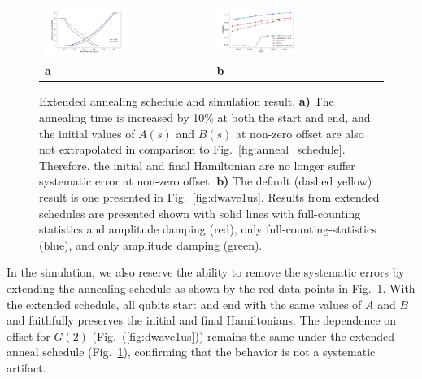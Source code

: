 \documentclass[prd,twocolumn,tightenlines,preprintnumbers,showpacs,superscriptaddress,notitlepage,nofootinbib,eqsecnum,floatfix,longbibliography,aps,10pt]{revtex4-2}
\begin{document}
\begin{figure}
    \centering
	\begin{tabular}{p{}p{}}
	\includegraphics[width=0.5\textwidth]{./new_figures/anneal_schedule_extended.pdf}
    &
	\includegraphics[width=0.5\textwidth]{./new_figures/NN2_offset_scaling_extended.pdf}\\
	\centering \textbf{a} & \centering \textbf{b}
	\end{tabular}
	\centering
	\caption{Extended annealing schedule and simulation result. \textbf{a)} The annealing time is increased by 10\% at both the start and end, and the initial values of $A(s)$ and $B(s)$ at non-zero offset are also not extrapolated in comparison to Fig.~\ref{fig:anneal_schedule}. Therefore, the initial and final Hamiltonian are no longer suffer systematic error at non-zero offset. \textbf{b)} The default (dashed yellow) result is one presented in Fig.~\ref{fig:dwave1us}. Results from extended schedules are presented shown with solid lines with full-counting statistics and amplitude damping (red), only full-counting-statistics (blue), and only amplitude damping (green).
    }
	\label{fig:anneal_schedule_ext}
\end{figure}

In the simulation, we also reserve the ability to remove the systematic errors by extending the annealing schedule as shown by the red data points in Fig.~\ref{fig:anneal_schedule_ext}. With the extended schedule, all qubits start and end with the same values of $A$ and $B$ and faithfully preserves the initial and final Hamiltonians. The dependence on offset for $G(2)$ (Fig.~(\ref{fig:dwave1us})) remains the same under the extended anneal schedule (Fig.~\ref{fig:anneal_schedule_ext}), confirming that the behavior is not a systematic artifact.
\end{document}
